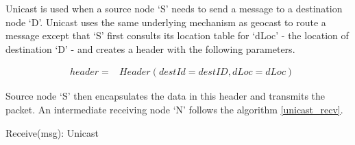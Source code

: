 Unicast is used when a source node `S' needs to send a message to a destination node `D'. Unicast uses the same underlying mechanism as geocast to route a message except that `S' first consults its location table for `dLoc' - the location of destination `D' - and creates a header with the following parameters.

\begin{eqnarray*}
& header = & Header(destId = destID, dLoc = dLoc)
\end{eqnarray*}

Source node `S' then encapsulates the data in this header and transmits the packet.
An intermediate receiving node `N' follows the algorithm \ref{unicast_recv}.

\begin{algorithm}
\caption{Receive(msg): Unicast} 
\label{unicast_recv}
\DontPrintSemicolon
{}
\end{algorithm}
